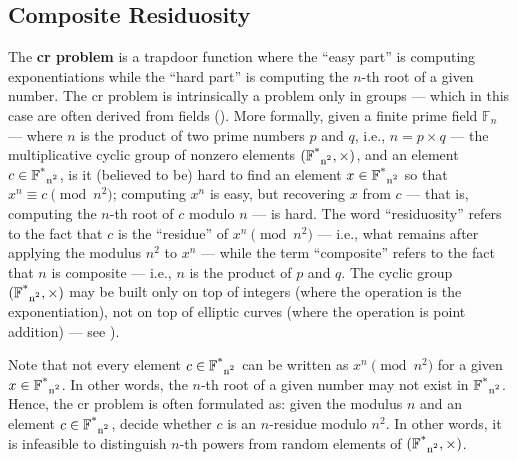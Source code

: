 \subsection{Composite Residuosity}\label{sec:trapdoor_functions:composite_residuosity}

The \textbf{\gls{cr} problem} is a trapdoor function where the ``easy part'' is computing exponentiations while the ``hard part'' is computing the $n$-th root of a given number. The \gls{cr} problem is intrinsically a problem only in groups --- which in this case are often derived from fields (). More formally, given a finite prime field $\mathbb{F}_n$ --- where $n$ is the product of two prime numbers $p$ and $q$, i.e., $n = p \times q$ --- the multiplicative cyclic group of nonzero elements $(\mathbb{F}\textsuperscript{*}\textsubscript{n\textsuperscript{2}}, \times)$, and an element $c \in \mathbb{F}\textsuperscript{*}\textsubscript{n\textsuperscript{2}}$, is it (believed to be) hard to find an element $x \in \mathbb{F}\textsuperscript{*}\textsubscript{n\textsuperscript{2}}$ so that $x^n \equiv c \pmod{n^2}$; computing $x ^ n$ is easy, but recovering $x$ from $c$ --- that is, computing the $n$-th root of $c$ modulo $n$ --- is hard. The word ``residuosity'' refers to the fact that $c$ is the ``residue'' of $x^n \pmod{n^2}$ --- i.e., what remains after applying the modulus $n^2$ to $x^n$ --- while the term ``composite'' refers to the fact that $n$ is composite --- i.e., $n$ is the product of $p$ and $q$. The cyclic group $(\mathbb{F}\textsuperscript{*}\textsubscript{n\textsuperscript{2}}, \times)$ may be built only on top of integers (where the operation is the exponentiation), not on top of elliptic curves (where the operation is point addition) --- see ).

Note that not every element $c \in \mathbb{F}\textsuperscript{*}\textsubscript{n\textsuperscript{2}}$ can be written as $x^n \pmod{n^2}$ for a given $x \in \mathbb{F}\textsuperscript{*}\textsubscript{n\textsuperscript{2}}$. In other words, the $n$-th root of a given number may not exist in $\mathbb{F}\textsuperscript{*}\textsubscript{n\textsuperscript{2}}$. Hence, the \gls{cr} problem is often formulated as: given the modulus $n$ and an element $c \in \mathbb{F}\textsuperscript{*}\textsubscript{n\textsuperscript{2}}$, decide whether $c$ is an $n$-residue modulo $n^2$. In other words, it is infeasible to distinguish $n$-th powers from random elements of $(\mathbb{F}\textsuperscript{*}\textsubscript{n\textsuperscript{2}}, \times)$.


